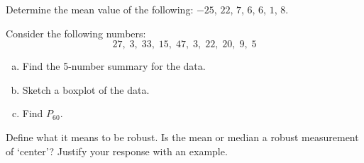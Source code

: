 \documentclass[11pt,letterpaper]{article}
\begin{document}

 Determine the mean value of the following: $-25$, $22$, $7$, $6$, $6$, $1$, $8$. 



\newpage



 Consider the following numbers:
	\[
	27, \; 3, \; 33, \; 15, \; 47, \; 3, \; 22, \; 20, \; 9, \; 5
	\]
\begin{enumerate}[(a)]
\item Find the 5-number summary for the data.
\item Sketch a boxplot of the data.
\item Find $P_{60}$. 
\end{enumerate}



\newpage



 Define what it means to be robust. Is the mean or median a robust measurement of `center'? Justify your response with an example. 
\end{document}
